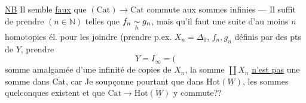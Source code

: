 \uline{NB} Il semble \uline{faux} que $(\mathrm{Cat})\longrightarrow\overline{\mathrm{Cat}}$ commute aux sommes infinies --- Il suffit de prendre   
$(n\in\mathbb N)$ telles que $f_n\underset{h}\sim g_n$, mais qu'il faut une suite d'au moins $n$ homotopies él. pour les joindre (prendre p.ex. $X_n=\Delta_0$, $f_n,g_n$ définis par des pts de $Y$, prendre
\[
Y=I_\infty=(
\]
somme amalgamée d'une infinité de copies de $X_n$,   la somme $\coprod X_n$ \uline{n'est pas} une somme dans $\overline{\mathrm{Cat}}$, car Je soupçonne pourtant que dans $\mathrm{Hot}(\underline W)$, les sommes quelconques existent et que $\mathrm{Cat}\longrightarrow\mathrm{Hot}(\underline W)$ y commute??

